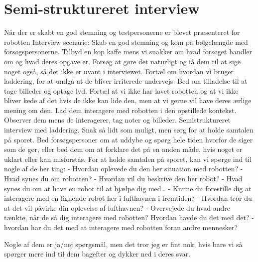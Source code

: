\section{Semi-struktureret interview}
\label{ParametreInterview}
%
Når der er skabt en god stemning og testpersonerne er blevet præsenteret for robotten
Interview scenarie:
Skab en god stemning og kom på bølgelængde med forsøgspersonerne. Tilbyd en kop kaffe mens vi snakker om hvad forsøget handler om og hvad deres opgave er. Forsøg at gøre det naturligt og få dem til at sige noget også, så det ikke er uvant i interviewet. Fortæl om hvordan vi bruger laddering, for at undgå at de bliver irriterede undervejs. Bed om tilladelse til at tage billeder og optage lyd. Fortæl at vi ikke har lavet robotten og at vi ikke bliver kede af det hvis de ikke kan lide den, men at vi gerne vil have deres ærlige mening om den.
Lad dem interagere med robotten i den opstillede kontekst.
Observer dem mens de interagerer, tag noter og billeder.
Semistruktureret interview med laddering. Snak så lidt som muligt, men sørg for at holde samtalen på sporet. Bed forsøgspersoner om at uddybe og spørg hele tiden hvorfor de siger som de gør, eller bed dem om at forklare det på en anden måde, hvis noget er uklart eller kan misforstås. For at holde samtalen på sporet, kan vi spørge ind til nogle af de her ting:
-	Hvordan oplevede du den her situation med robotten?
-	Hvad synes du om robotten?
-	Hvordan vil du beskrive den her robot?
-	Hvad synes du om at have en robot til at hjælpe dig med…
-	Kunne du forestille dig at interagere med en lignende robot her i lufthavnen i fremtiden?
-	Hvordan tror du at det vil påvirke din oplevelse af lufthavnen?
-	Overvejede du hvad andre tænkte, når de så dig interagere med robotten? Hvordan havde du det med det?
-	hvordan har du det med at interagere med robotten foran andre mennesker?

Nogle af dem er ja/nej spørgsmål, men det tror jeg er fint nok, hvis bare vi så spørger mere ind til dem bagefter og dykker ned i deres svar. 